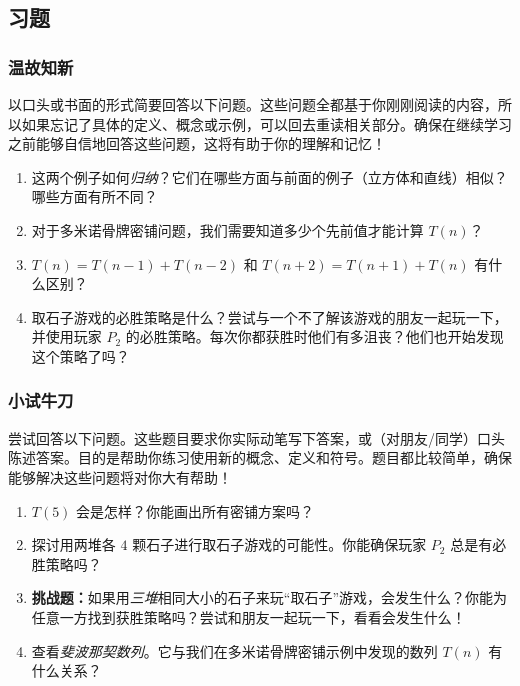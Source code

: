 \subsection{习题}

\subsubsection*{温故知新}

以口头或书面的形式简要回答以下问题。这些问题全都基于你刚刚阅读的内容，所以如果忘记了具体的定义、概念或示例，可以回去重读相关部分。确保在继续学习之前能够自信地回答这些问题，这将有助于你的理解和记忆！

\begin{enumerate}[label=(\arabic*)]
    \item 这两个例子如何\emph{归纳}？它们在哪些方面与前面的例子（立方体和直线）相似？哪些方面有所不同？
    \item 对于多米诺骨牌密铺问题，我们需要知道多少个先前值才能计算 $T(n)$？
    \item $T(n) = T(n - 1) + T(n - 2)$ 和 $T(n + 2) = T(n + 1) + T(n)$ 有什么区别？
    \item 取石子游戏的必胜策略是什么？尝试与一个不了解该游戏的朋友一起玩一下，并使用玩家 $P_2$ 的必胜策略。每次你都获胜时他们有多沮丧？他们也开始发现这个策略了吗？
\end{enumerate}

\subsubsection*{小试牛刀}

尝试回答以下问题。这些题目要求你实际动笔写下答案，或（对朋友/同学）口头陈述答案。目的是帮助你练习使用新的概念、定义和符号。题目都比较简单，确保能够解决这些问题将对你大有帮助！

\begin{enumerate}[label=(\arabic*)]
    \item $T(5)$ 会是怎样？你能画出所有密铺方案吗？
    \item 探讨用两堆各 $4$ 颗石子进行取石子游戏的可能性。你能确保玩家 $P_2$ 总是有必胜策略吗？
    \item \textbf{挑战题：}如果用\emph{三堆}相同大小的石子来玩``取石子''游戏，会发生什么？你能为任意一方找到获胜策略吗？尝试和朋友一起玩一下，看看会发生什么！
    \item 查看\emph{斐波那契数列}。它与我们在多米诺骨牌密铺示例中发现的数列 $T(n)$ 有什么关系？
\end{enumerate}